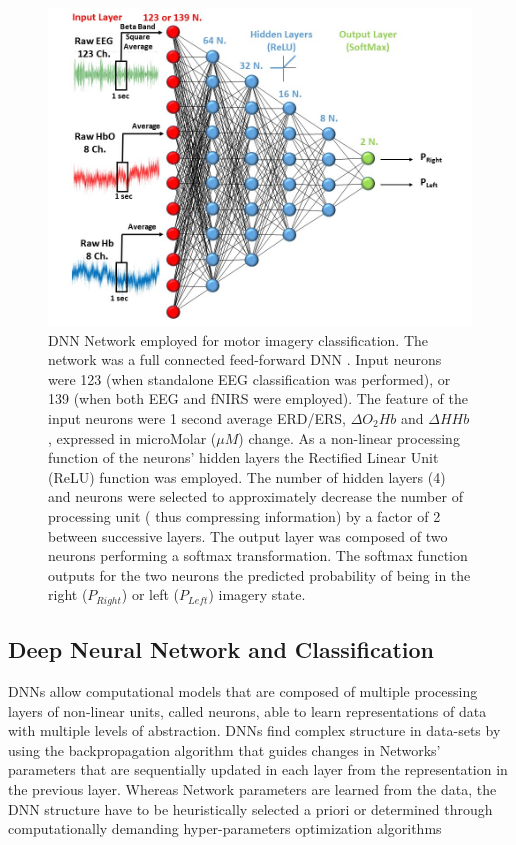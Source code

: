 \documentclass[12pt ]{iopart}
\begin{document}
\begin{figure}
	\includegraphics[width=\linewidth]{Slide3.JPG}
	\caption{DNN Network employed for motor imagery classification. The network was a full connected feed-forward  DNN . Input neurons were 123 (when standalone EEG classification was performed), or 139 (when both EEG and fNIRS were employed). 
	The feature of the input neurons were 1 second average ERD/ERS, $\Delta O_{2}Hb$ and $\Delta HHb$, expressed in microMolar ($\mu M$) change. 
	 As a non-linear processing function of the neurons' hidden layers the Rectified Linear Unit (ReLU) function was employed. 
	 The number of hidden layers (4) and neurons were selected to approximately decrease the number of processing unit ( thus compressing information) by a factor of 2 between successive layers. The output layer was composed of two neurons performing a softmax transformation. The softmax function outputs for the two neurons  the predicted probability of being in the right ($P_{Right}$) or left ($P_{Left}$) imagery state. }
	\label{fig:fig3}
\end{figure}

\subsection{Deep Neural Network and Classification}
DNNs allow computational models that are composed of multiple  processing layers of non-linear units, called neurons, able to learn representations of data with multiple levels of abstraction.
DNNs find complex structure in  data-sets by using the backpropagation algorithm \parencite{hecht1988theory} that guides changes in Networks' parameters that are sequentially updated in each layer from the representation in the previous layer.
Whereas Network parameters are learned from the data, the DNN structure have to be heuristically selected a priori or determined through computationally demanding hyper-parameters optimization algorithms %
\parencite{mackay1996hyperparameters,snoek2012practical,bengio2000gradient}
\end{document}
